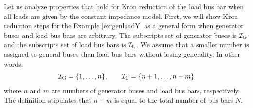 \documentclass[graybox, envcountchap]{svmult}
\begin{document}
Let us analyze properties that hold for Kron reduction of the load bus bar when all loads are given by the constant impedance model.
First, we will show Kron reduction steps for the Example \ref{ex:genloadY} as a general form when generator buses and load bus bars are arbitrary.
The subscripts set of generator buses is $\mathcal{I}_{\rm G}$ and the subscripts set of load bus bars is $\mathcal{I}_{\rm L}$.
We assume that a smaller number is assigned to general buses than load bus bars without losing generality. In other words:
\begin{equation*}
\mathcal{I}_{\rm G} = \{ 1,\ldots, n \},\qquad
\mathcal{I}_{\rm L} = \{ n+1,\ldots, n + m \}
\end{equation*}
where $n$ and $m$ are numbers of generator buses and load bus bars, respectively.
The definition stipulates that $n+m$ is equal to the total number of bus bars $N$.
\end{document}
